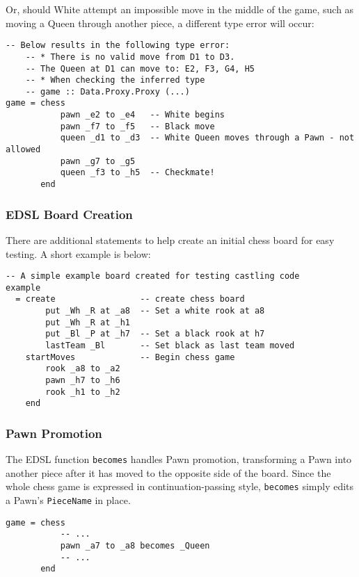 \documentclass[12pt, a4paper]{scrartcl}
\begin{document}
Or, should White attempt an impossible move in the middle of the game, such as moving a Queen through another piece, a different type error will occur:

\begin{lstlisting}
-- Below results in the following type error:
    -- * There is no valid move from D1 to D3.
    -- The Queen at D1 can move to: E2, F3, G4, H5
    -- * When checking the inferred type
    -- game :: Data.Proxy.Proxy (...)
game = chess
           pawn _e2 to _e4   -- White begins
           pawn _f7 to _f5   -- Black move
           queen _d1 to _d3  -- White Queen moves through a Pawn - not allowed
           pawn _g7 to _g5
           queen _f3 to _h5  -- Checkmate!
       end
\end{lstlisting}

\subsubsection{EDSL Board Creation}

There are additional statements to help create an initial chess board for easy testing. A short example is below:

\begin{lstlisting}
-- A simple example board created for testing castling code
example
  = create                 -- create chess board
        put _Wh _R at _a8  -- Set a white rook at a8
        put _Wh _R at _h1
        put _Bl _P at _h7  -- Set a black rook at h7
        lastTeam _Bl       -- Set black as last team moved
    startMoves             -- Begin chess game
        rook _a8 to _a2
        pawn _h7 to _h6
        rook _h1 to _h2
    end
\end{lstlisting}

\subsubsection{Pawn Promotion}

The EDSL function \lstinline{becomes} handles Pawn promotion, transforming a Pawn into another piece after it has moved to the opposite side of the board. Since the whole chess game is expressed in continuation-passing style, \lstinline{becomes} simply edits a Pawn's \lstinline{PieceName} in place.

\begin{lstlisting}
game = chess
           -- ...
           pawn _a7 to _a8 becomes _Queen
           -- ...
       end
\end{lstlisting}
\end{document}
